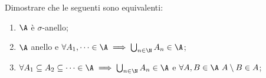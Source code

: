 \documentclass[../main.tex]{subfiles}
\begin{document}
Dimostrare che le seguenti sono equivalenti:
\begin{enumerate}
\item $\A$ \`e $\sigma$-anello;
\item $\A$ anello e $\forall A_1, \dots \in \A \implies \bigcup_{n\in \N}A_{n}\in\A$;
\item $\forall A_1 \subseteq  A_{2} \subseteq \dots \in \A \implies \bigcup_{n\in \N}A_{n}\in\A$ e $\forall A,B \in \A\ A\setminus B \in A$;
\end{enumerate}
\solution
\end{document}
